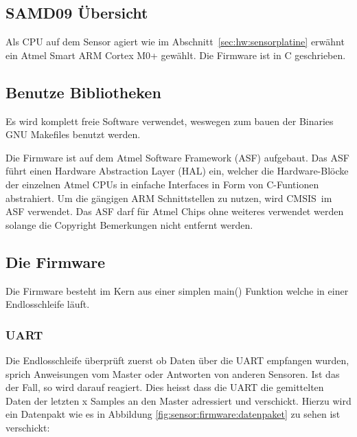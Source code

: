 \subsection{SAMD09 \"Ubersicht}

Als CPU auf dem Sensor agiert wie im Abschnitt~\ref{sec:hw:sensorplatine} erw\"ahnt ein Atmel Smart ARM Cortex M0+ gew\"ahlt.
Die Firmware ist in C geschrieben.

\subsection{Benutze Bibliotheken}

Es wird komplett freie Software verwendet, weswegen zum bauen der Binaries GNU Makefiles benutzt werden.

Die Firmware ist auf dem Atmel Software Framework (ASF) aufgebaut. Das ASF f\"uhrt einen Hardware Abstraction Layer (HAL) ein, welcher die Hardware-Bl\"ocke der einzelnen Atmel CPUs in einfache Interfaces in Form von C-Funtionen abstrahiert.
Um die g\"angigen ARM Schnittstellen zu nutzen, wird CMSIS im ASF verwendet.
Das ASF darf f\"ur Atmel Chips ohne weiteres verwendet werden solange die Copyright Bemerkungen nicht entfernt werden.

\subsection{Die Firmware}

Die Firmware besteht im Kern aus einer simplen main() Funktion welche in einer Endlosschleife l\"auft.

\subsubsection{UART}
\label{subs:UART}

Die Endlosschleife \"uberpr\"uft zuerst ob Daten \"uber die UART empfangen wurden, sprich Anweisungen vom Master oder Antworten von anderen Sensoren. Ist das der Fall, so wird darauf reagiert. Dies heisst dass die UART die gemittelten Daten der letzten x Samples an den Master adressiert und verschickt.
Hierzu wird ein Datenpakt wie es in Abbildung \ref{fig:sensor:firmware:datenpaket} zu sehen ist verschickt:

